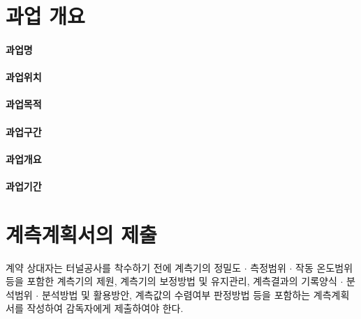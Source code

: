 \documentclass[12pt, a4paper, oneside]{book}
\let\stdsection\section
\renewcommand\section{\newpage\stdsection}
\begin{document}
	\section{과업 개요}

		\paragraph{과업명}
		
		\paragraph{과업위치}
		
		\paragraph{과업목적}
		
		\paragraph{과업구간}
		
		\paragraph{과업개요}
		
		\paragraph{과업기간}
		
		
	\section{계측계획서의 제출}


		\begin{mdframed}[style=con_specification, frametitle={\large 일반국도공사 전문시방서}]

계약 상대자는 터널공사를 착수하기 전에 계측기의 정밀도 $\cdot$ 측정범위 $\cdot$ 작동 온도범위 등을 포함한 계측기의 제원, 계측기의 보정방법 및 유지관리, 계측결과의 기록양식 $\cdot$ 분석범위 $\cdot$ 분석방법 및 활용방안, 계측값의 수렴여부 판정방법 등을 포함하는 계측계획서를 작성하여 감독자에게 제출하여야 한다.

		\end{mdframed}

		
\end{document}
